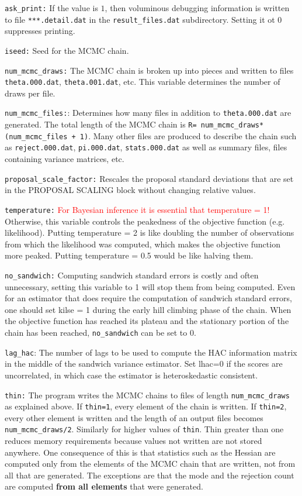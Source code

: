 \documentclass[11pt, letterpaper, notitlepage]{article}
\begin{document}
\texttt{ask\_print:} If the value is $1$, then voluminous debugging information is written to file \texttt{***.detail.dat} in the \texttt{result\_files.dat} subdirectory. Setting it ot $0$ suppresses printing.

\texttt{iseed:} Seed for the MCMC chain.

\texttt{num\_mcmc\_draws:} The MCMC chain is broken up into pieces and written to files \texttt{theta.000.dat}, \texttt{theta.001.dat}, etc. This variable determines the number of draws per file.

\texttt{num\_mcmc\_files:}: Determines how many files in addition to \texttt{theta.000.dat} are generated. The total length of the MCMC chain is \texttt{R= num\_mcmc\_draws*(num\_mcmc\_files + 1)}. Many other files are produced to describe the chain such as \texttt{reject.000.dat}, \texttt{pi.000.dat}, \texttt{stats.000.dat} as well as summary files, files containing variance matrices, etc. 

\texttt{proposal\_scale\_factor:} Rescales the proposal standard deviations that are set in the PROPOSAL SCALING
block without changing relative values.

\texttt{temperature:} \textcolor{red}{For Bayesian inference it is essential that temperature = 1!} Otherwise, this variable controls the peakedness of the objective function (e.g. likelihood). Putting temperature = 2 is like doubling the number of observations from which the likelihood was computed, which makes the objective function more peaked. Putting temperature = 0.5 would be like halving them. 

\texttt{no\_sandwich:} Computing sandwich standard errors is costly and often unnecessary, setting this variable to 1 will stop them from being computed. Even for an estimator that does require the computation of sandwich standard errors, one should set kilse = 1 during the early hill climbing phase of the chain. When the objective function has reached its plateau and the stationary portion of the chain has been reached, \texttt{no\_sandwich} can be set to 0. 

\texttt{lag\_hac}: The number of lags to be used to compute the HAC information matrix in the middle of the sandwich variance estimator. Set lhac=0 if the scores are uncorrelated, in which case the estimator is heteroskedastic consistent.

\texttt{thin:} The program writes the MCMC chains to files of length \texttt{num\_mcmc\_draws} as explained above. If \texttt{thin=1}, every element of the chain is written. If \texttt{thin=2}, every other element is written and the length of an output files becomes \texttt{num\_mcmc\_draws/2}. Similarly for higher values of \texttt{thin}. Thin greater than one reduces memory requirements because values not written are not stored anywhere. One consequence of this is that statistics such as the Hessian are computed only from the elements of the MCMC chain that are written, not from all that are generated. The exceptions are that the mode and the rejection count are computed \textbf{from all elements} that were generated.
\end{document}
